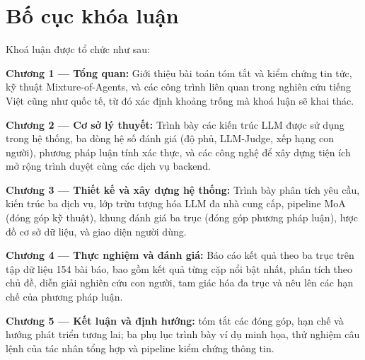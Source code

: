 \section*{Bố cục khóa luận}

Khoá luận được tổ chức như sau:

\textbf{Chương 1 --- Tổng quan:} Giới thiệu bài toán tóm tắt và kiểm chứng tin tức,
kỹ thuật Mixture-of-Agents, và các công trình liên quan trong nghiên cứu tiếng Việt
cũng như quốc tế, từ đó xác định khoảng trống mà khoá luận sẽ khai thác.

\textbf{Chương 2 --- Cơ sở lý thuyết:} Trình bày các kiến trúc LLM được sử dụng
trong hệ thống, ba dòng hệ số đánh giá (độ phủ, LLM-Judge, xếp hạng con người),
phương pháp luận tính xác thực, và các công nghệ để xây dựng tiện ích mở rộng trình
duyệt cùng các dịch vụ backend.

\textbf{Chương 3 --- Thiết kế và xây dựng hệ thống:} Trình bày phân tích yêu cầu,
kiến trúc ba dịch vụ, lớp trừu tượng hóa LLM đa nhà cung cấp, pipeline MoA (đóng
góp kỹ thuật), khung đánh giá ba trục (đóng góp phương pháp luận), lược đồ cơ sở
dữ liệu, và giao diện người dùng.

\textbf{Chương 4 --- Thực nghiệm và đánh giá:} Báo cáo kết quả theo ba trục trên
tập dữ liệu 154 bài báo, bao gồm kết quả từng cặp nổi bật nhất, phân tích theo chủ đề, diễn giải nghiên cứu
con người, tam giác hóa đa trục và nêu lên các hạn chế của phương pháp luận.

\textbf{Chương 5 --- Kết luận và định hướng:} tóm tắt các đóng góp, hạn chế và hướng phát triển tương lai;
ba phụ lục trình bày ví dụ minh họa, thử nghiệm câu lệnh của tác nhân tổng hợp và
pipeline kiểm chứng thông tin.
